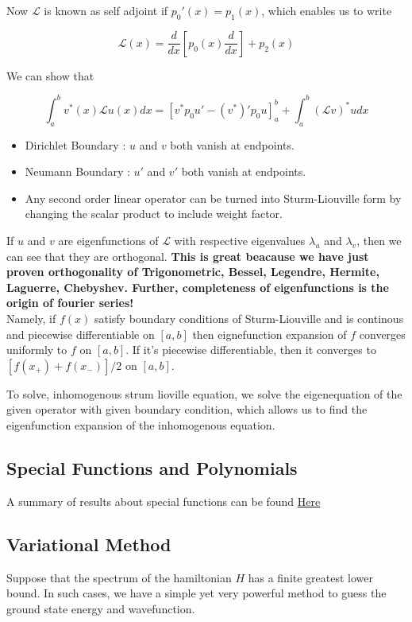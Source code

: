 \documentclass{report}
\begin{document}
\noindent Now $\mathcal{L}$ is known as self adjoint if $p_0'(x) = p_1(x)$, which enables us to write 

$$\mathcal{L}(x) = \frac{d}{dx}\left[p_0(x)\frac{d}{dx}\right]+p_2(x)$$

\noindent We can show that

$$\int_{a}^{b}v^*(x)\mathcal{L}u(x)dx = \left[v^* p_0 u' - (v^*)'p_0 u\right]_{a}^{b} + \int_{a}^{b}(\mathcal{L}v)^* u dx$$

\begin{itemize}
  \item Dirichlet Boundary : $u$ and $v$ both vanish at endpoints.
  \item Neumann Boundary : $u'$ and $v'$ both vanish at endpoints.
  \item Any second order linear operator can be turned into Sturm-Liouville form by changing the scalar product to include weight factor.
\end{itemize}

\noindent If $u$ and $v$ are eigenfunctions of $\mathcal{L}$ with respective eigenvalues $\lambda_u$ and $\lambda_v$, then we can see that they are orthogonal. \textbf{This is great beacause we have just proven orthogonality of Trigonometric, Bessel, Legendre, Hermite, Laguerre, Chebyshev. Further, completeness of eigenfunctions is the origin of fourier series!}\\

\noindent Namely, if $f(x)$ satisfy boundary conditions of Sturm-Liouville and is continous and piecewise differentiable on $[a,b]$ then eignefunction expansion of $f$ converges uniformly to $f$ on $[a,b]$. If it's piecewise differentiable, then it converges to $[f(x_+) + f(x_-)]/2$ on $[a,b]$.

\noindent To solve, inhomogenous strum lioville equation, we solve the eigenequation of the given operator with given boundary condition, which allows us to find the eigenfunction expansion of the inhomogenous equation.

\subsection{Special Functions and Polynomials}

A summary of results about special functions can be found \href{https://webspace.science.uu.nl/~hooft101/lectures/specialfct.pdf}{Here}

\subsection{Variational Method}
Suppose that the spectrum of the hamiltonian $H$ has a finite greatest lower bound. In such cases, we have a simple yet very powerful method to guess the ground state energy and wavefunction.
\end{document}
